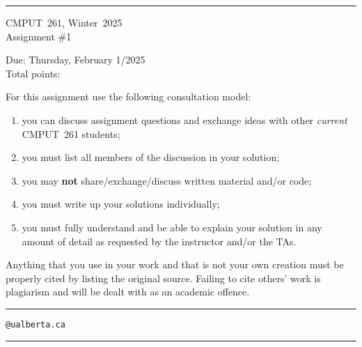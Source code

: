 \documentclass{article}
\newcommand{\classname}{CMPUT~261}
\newcommand{\termname}{Winter~2025}
\newcommand{\duedate}{Thursday, February 1/2025}
\newcommand{\assignNum}{1}
\newcounter{totalpoints}
\begin{document}

{\bigskip\hrule\bigskip
\huge
\noindent \classname{}, \termname{}\\
Assignment \#\assignNum{}

\large
Due: \duedate{}\\
Total points: 

For this assignment use the following consultation model:
\begin{enumerate}

\item you can discuss assignment questions and exchange ideas with other \emph{current} \classname{} students;

\item you must list all members of the discussion in your solution;

\item you may {\bf not} share/exchange/discuss written material and/or code;

\item you must write up your solutions individually;

\item you must fully understand and be able to explain your solution in any amount of detail as requested by the instructor and/or the TAs.

\end{enumerate}

Anything that you use in your work and that is not your own creation must be properly cited by listing the original source. Failing to cite others' work is plagiarism and will be dealt with as an academic offence.


\bigskip\bigskip\hrule\bigskip

\vspace{1cm}
\hspace{1cm}{\bf First name:} \underline{\hspace{7cm}}

\vspace{1cm}
\hspace{1cm}{\bf Last name:} \underline{\hspace{7cm}}

\vspace{1cm}
\hspace{1cm}{\bf CCID:} \underline{\hspace{5.5cm}}\verb|@ualberta.ca|

\vspace{1cm}
\bigskip\hrule\bigskip
}
\end{document}
